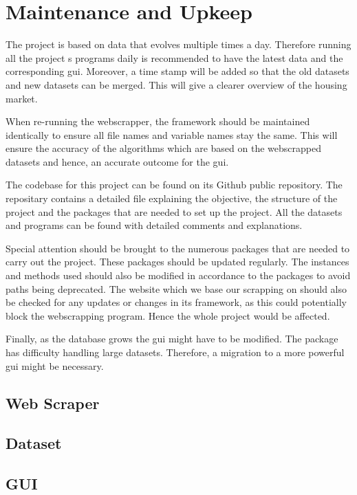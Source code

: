 \documentclass[main]{subfiles}
\begin{document}
\section{Maintenance and Upkeep}

The project is based on data that evolves multiple times a day. 
Therefore running all the project s programs daily is recommended to have the latest data and the corresponding \ac{gui}. 
Moreover, a time stamp will be added so that the old datasets and new datasets can be merged. 
This will give a clearer overview of the housing market. \par
When re-running the webscrapper, the framework should be maintained identically to ensure all file names and variable names stay the same. 
This will ensure the accuracy of the algorithms which are based on the webscrapped datasets and hence, an accurate outcome for the \ac{gui}. \par
The codebase for this project can be found on its Github public repository. 
The repositary contains a detailed \pkg[readme.md] file explaining the objective, the structure of the project and the packages that are needed to set up the project. 
All the datasets and programs can be found with detailed comments and explanations.\par
Special attention should be brought to the numerous packages that are needed to carry out the project. 
These packages should be updated regularly. The instances and methods used should also be modified in accordance to the packages to avoid paths being deprecated.
The website which we base our scrapping on should also be checked for any updates or changes in its framework, 
as this could potentially block the webscrapping program. Hence the whole project would be affected.\par
Finally, as the database grows the \ac{gui} might have to be modified. The \pkg[tkinter] package has difficulty handling large datasets.
Therefore, a migration to a more powerful \ac{gui} might be necessary.


\subsection{Web Scraper}


\subsection{Dataset}

\subsection{GUI}
\end{document}
